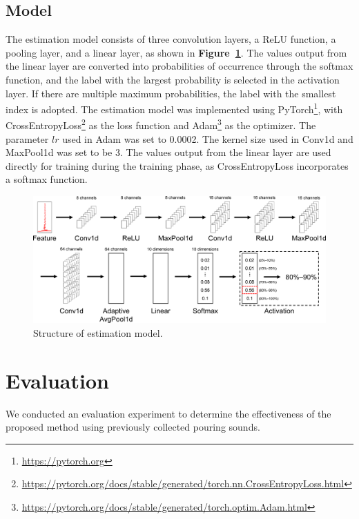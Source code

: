 \documentclass[manuscript,screen,review]{acmart}
\newcommand\figref[1]{\textbf{Figure~\ref{fig:#1}}}
\begin{document}
\subsection{Model}
The estimation model consists of three convolution layers, a ReLU function, a pooling layer, and a linear layer, as shown in \figref{model}. The values output from the linear layer are converted into probabilities of occurrence through the softmax function, and the label with the largest probability is selected in the activation layer. If there are multiple maximum probabilities, the label with the smallest index is adopted. The estimation model was implemented using PyTorch\footnote{\url{https://pytorch.org}}, with CrossEntropyLoss\footnote{\url{https://pytorch.org/docs/stable/generated/torch.nn.CrossEntropyLoss.html}} as the loss function and Adam\footnote{\url{https://pytorch.org/docs/stable/generated/torch.optim.Adam.html}} as the optimizer. The parameter $lr$ used in Adam was set to 0.0002. The kernel size used in Conv1d and MaxPool1d was set to be 3. The values output from the linear layer are used directly for training during the training phase, as CrossEntropyLoss incorporates a softmax function.

\begin{figure}[!t]
  \centering
  \includegraphics[width=0.8\linewidth]{figures/model.eps}
  \caption{Structure of estimation model.}
  \label{fig:model}
\end{figure}



\section{Evaluation}
\label{sec:evaluation}
We conducted an evaluation experiment to determine the effectiveness of the proposed method using previously collected pouring sounds.

\end{document}
